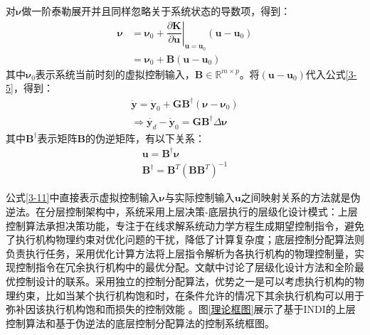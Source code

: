 对$\boldsymbol{\nu}$做一阶泰勒展开并且同样忽略关于系统状态的导数项，得到：
\begin{equation}
    \begin{aligned}
    \boldsymbol{\nu} &= \boldsymbol{\nu}_0 +  \left.\dfrac{\partial \boldsymbol{K}}{\partial \boldsymbol{u}}\right|_{\boldsymbol{u}=\boldsymbol{u}_0}(\boldsymbol{u}-\boldsymbol{u}_0)\\
        &= \boldsymbol{\nu}_0 + \boldsymbol{B}(\boldsymbol{u}-\boldsymbol{u}_0)
    \end{aligned}
    \label{3-9}
\end{equation}
其中$\boldsymbol{\nu}_0$表示系统当前时刻的虚拟控制输入，$\boldsymbol{B}\in\mathbb{R}^{m\times p}$。将$(\boldsymbol{u}-\boldsymbol{u}_0)$代入公式\eqref{3-5}，得到：
\begin{equation}
    \begin{aligned}
    \dot{\boldsymbol{y}}=\dot{\boldsymbol{y}}_0+\boldsymbol{G}\boldsymbol{B}^\dagger(\boldsymbol{\nu}-\boldsymbol{\nu}_0)\\
    \Rightarrow \dot{\boldsymbol{y}_d}-\dot{\boldsymbol{y}}_0 = \boldsymbol{G}\boldsymbol{B}^\dagger\Delta\boldsymbol{\nu}
    \label{3-10}
    \end{aligned}
\end{equation}
其中$\boldsymbol{B}^\dagger$表示矩阵$\boldsymbol{B}$的伪逆矩阵，有以下关系：
\begin{gather}
    \boldsymbol{u}=\boldsymbol{B}^\dagger\boldsymbol{\nu}    \label{3-11}
    \\ 
    \boldsymbol{B}^\dagger=\boldsymbol{B}^T\left(\boldsymbol{B}\boldsymbol{B}^T\right)^{-1}    \label{3-12}
\end{gather}

公式\eqref{3-11}中直接表示虚拟控制输入$\boldsymbol{\nu}$与实际控制输入$\boldsymbol{u}$之间映射关系的方法就是伪逆法。在分层控制架构中，系统采用上层决策-底层执行的层级化设计模式：上层控制算法承担决策功能，专注于在线求解系统动力学方程生成期望控制指令，避免了执行机构物理约束对优化问题的干扰，降低了计算复杂度；底层控制分配算法则负责执行任务，采用优化计算方法将上层指令解析为各执行机构的物理控制量，实现控制指令在冗余执行机构中的最优分配。文献\parencite{harkegardResolvingActuatorRedundancy2005}中讨论了层级化设计方法和全阶最优控制设计的联系。采用独立的控制分配算法，优势之一是可以考虑执行机构的物理约束，比如当某个执行机构饱和时，在条件允许的情况下其余执行机构可以用于弥补因该执行机构饱和而损失的控制效能 。图\ref{理论框图}展示了基于INDI的上层控制算法和基于伪逆法的底层控制分配算法的控制系统框图。

